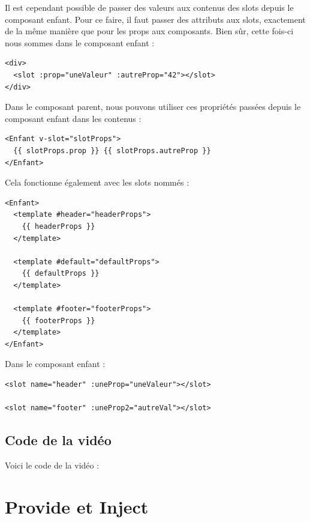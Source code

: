 \documentclass{article}
\begin{document}
Il est cependant possible de passer des valeurs aux contenus des {\color{monOrange}slots} depuis le composant enfant. Pour ce faire, il faut passer des attributs aux {\color{monOrange}slots}, exactement de la même manière que pour les {\color{monOrange}props} aux composants. Bien sûr, cette fois-ci nous sommes dans le composant enfant :
\begin{verbatim}
<div>
  <slot :prop="uneValeur" :autreProp="42"></slot>
</div>
\end{verbatim}
Dans le composant parent, nous pouvons utiliser ces propriétés passées depuis le composant enfant dans les contenus :
\begin{verbatim}
<Enfant v-slot="slotProps">
  {{ slotProps.prop }} {{ slotProps.autreProp }}
</Enfant>
\end{verbatim}
Cela fonctionne également avec les {\color{monOrange}slots} nommés :
\begin{verbatim}
<Enfant>
  <template #header="headerProps">
    {{ headerProps }}
  </template>

  <template #default="defaultProps">
    {{ defaultProps }}
  </template>

  <template #footer="footerProps">
    {{ footerProps }}
  </template>
</Enfant>
\end{verbatim}
Dans le composant enfant :
\begin{verbatim}
<slot name="header" :uneProp="uneValeur"></slot>

<slot name="footer" :uneProp2="autreVal"></slot>
\end{verbatim}
\subsection{Code de la vidéo}
Voici le code de la vidéo :


\section{Provide et Inject}
\end{document}
